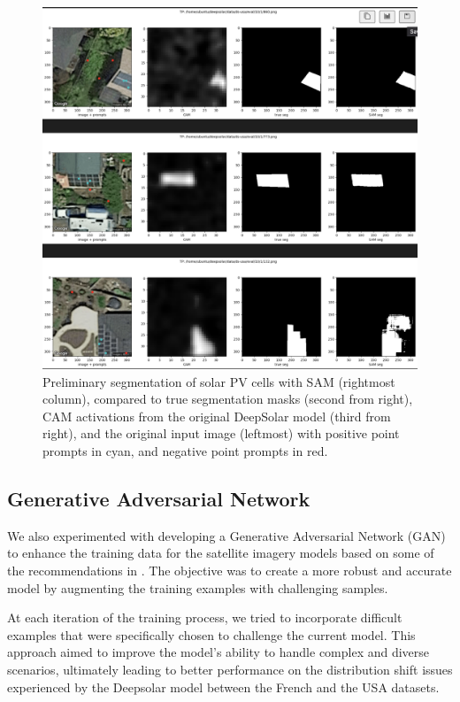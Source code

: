 \documentclass[10pt,twocolumn,letterpaper]{article}
\begin{document}
\begin{figure}[htp]
\centering
\includegraphics[width=15cm]{prelim_sam.png}
\caption{Preliminary segmentation of solar PV cells with SAM (rightmost column), compared to true segmentation masks (second from right), CAM activations from the original DeepSolar model (third from right), and the original input image (leftmost) with positive point prompts in cyan, and negative point prompts in red.}
\end{figure}

\subsection{Generative Adversarial Network}
We also experimented with developing a Generative Adversarial Network (GAN) to enhance the training data for the satellite imagery models based on some of the recommendations in \cite{volpi2018generalizing}. The objective was to create a more robust and accurate model by augmenting the training examples with challenging samples.

At each iteration of the training process, we tried to incorporate difficult examples that were specifically chosen to challenge the current model. This approach aimed to improve the model's ability to handle complex and diverse scenarios, ultimately leading to better performance on the distribution shift issues experienced by the Deepsolar model between the French and the USA datasets.
\end{document}
